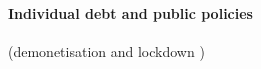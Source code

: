 \documentclass[a4paper, 11pt, onecolumn]{article}
\begin{document}
%
%
%
%
%
%
%


\paragraph{Individual debt and public policies}

(demonetisation \cite{GuerinDemo2017} and lockdown \cite{Guerin2020})
\end{document}
